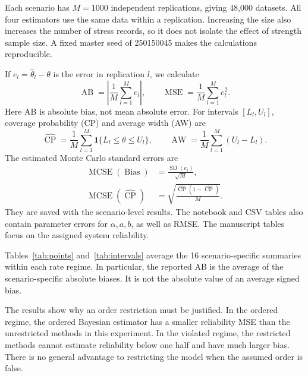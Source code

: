 \documentclass[a4paper,11pt]{article}
\begin{document}
Each scenario has $M=1000$ independent replications, giving 48,000 datasets. All four estimators use the same data within a replication. Increasing the size also increases the number of stress records, so it does not isolate the effect of strength sample size. A fixed master seed of 250150045 makes the calculations reproducible.

If $e_l=\widehat\theta_l-\theta$ is the error in replication $l$, we calculate
\begin{equation}
\operatorname{AB}=\left|\frac1M\sum_{l=1}^M e_l\right|,\qquad
\operatorname{MSE}=\frac1M\sum_{l=1}^M e_l^2.\label{eq:metrics}
\end{equation}
Here AB is absolute bias, not mean absolute error. For intervals $[L_l,U_l]$, coverage probability (CP) and average width (AW) are
\begin{equation}
\widehat{\operatorname{CP}}=\frac1M\sum_{l=1}^M\mathbf1\{L_l\le\theta\le U_l\},\qquad
\operatorname{AW}=\frac1M\sum_{l=1}^M(U_l-L_l).\label{eq:interval-metrics}
\end{equation}
The estimated Monte Carlo standard errors are
\begin{align}
\operatorname{MCSE}(\operatorname{Bias})&=\frac{\operatorname{SD}(e_l)}{\sqrt M},\\
\operatorname{MCSE}(\widehat{\operatorname{CP}})&=\sqrt{\frac{\widehat{\operatorname{CP}}(1-\widehat{\operatorname{CP}})}M}.
\end{align}
They are saved with the scenario-level results. The notebook and CSV tables also contain parameter errors for $\alpha,a,b$, as well as RMSE. The manuscript tables focus on the assigned system reliability.





Tables~\ref{tab:points} and~\ref{tab:intervals} average the 16 scenario-specific summaries within each rate regime. In particular, the reported AB is the average of the scenario-specific absolute biases. It is not the absolute value of an average signed bias.

The results show why an order restriction must be justified. In the ordered regime, the ordered Bayesian estimator has a smaller reliability MSE than the unrestricted methods in this experiment. In the violated regime, the restricted methods cannot estimate reliability below one half and have much larger bias. There is no general advantage to restricting the model when the assumed order is false.
\end{document}
